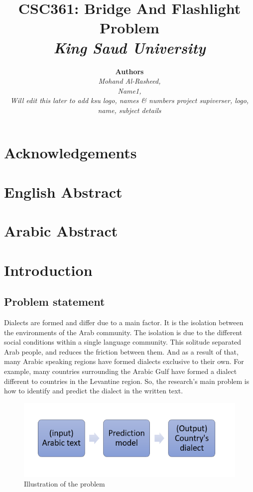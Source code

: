 \documentclass[12pt]{diazessay}
\title{\textbf{CSC361: Bridge And Flashlight Problem} \\ {\Large\itshape King Saud University}}
\author{\textbf{Authors} \\ \textit{Mohand Al-Rasheed,\\}\textit{Name1,\\}\textit{Will edit this later to add ksu logo, names \& numbers project supiverser, logo, name, subject details }}
\date{}
\begin{document}
\maketitle %
\clearpage


\tableofcontents

\cleardoublepage

\section*{Acknowledgements}

\section*{English Abstract}

\section*{Arabic Abstract}

\section{Introduction}

    \subsection{Problem statement}
    
    Dialects are formed and differ due to a main factor. It is the isolation between the environments of the Arab community. The isolation is due to the different social conditions within a single language community. This solitude separated Arab people, and reduces the friction between them. And as a result of that, many Arabic speaking regions have formed dialects exclusive to their own. For example, many countries surrounding the Arabic Gulf have formed a dialect different to countries in the Levantine region. So, the research’s main problem is how to identify and predict the dialect in the written text.

 
    \begin{figure}[h]
        \centering
        \includegraphics[scale=0.6]{Figures/problem_statment_fig.png}
        \caption{Illustration of the problem}
        \label{fig:cmp}
    \end{figure}
        
\end{document}
